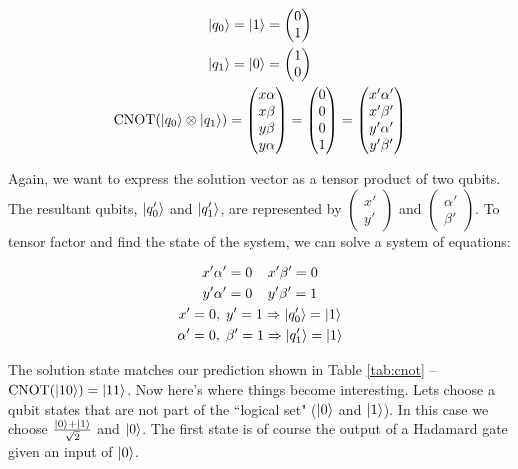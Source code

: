 \documentclass[conference]{IEEEtran}
\begin{document}
\begin{gather*}
\ket{q_0} = \ket{1} = \begin{pmatrix}0\\1\end{pmatrix}\\
\ket{q_1} = \ket{0} = \begin{pmatrix}1\\0\end{pmatrix}\\
\text{CNOT}(\ket{q_0} \otimes \ket{q_1}) =
\begin{pmatrix}x\alpha\\x\beta\\y\beta\\y\alpha\end{pmatrix} =
\begin{pmatrix}0\\0\\0\\1\end{pmatrix} = \begin{pmatrix}x'\alpha'\\x'\beta'\\y'\alpha'\\y'\beta'\end{pmatrix}
\end{gather*}

Again, we want to express the solution vector as a tensor product of two qubits. The resultant qubits, $\ket{q_0'}$ and $\ket{q_1'}$, are represented by $\begin{pmatrix}x'\\y'\end{pmatrix}$ and $\begin{pmatrix}\alpha'\\\beta'\end{pmatrix}$. To tensor factor and find the state of the system, we can solve a system of equations:

\begin{gather*}
x'\alpha' = 0 \;\;\;\; x'\beta' = 0\\
y'\alpha' = 0 \;\;\;\; y'\beta' = 1\\
x' = 0, \; y' = 1 \Rightarrow \ket{q_0'} = \ket{1} \\
\alpha' = 0, \; \beta' = 1 \Rightarrow \ket{q_1'} = \ket{1}
\end{gather*}

The solution state matches our prediction shown in Table \ref{tab:cnot} -- $\text{CNOT}(\ket{10}) = \ket{11}$. Now here's where things become interesting. Lets choose a qubit states that are not part of the ``logical set" ($\ket{0}$ and $\ket{1}$). In this case we choose $\frac{\ket{0} + \ket{1}}{\sqrt{2}}$ and $\ket{0}$. The first state is of course the output of a Hadamard gate given an input of $\ket{0}$.
\end{document}
